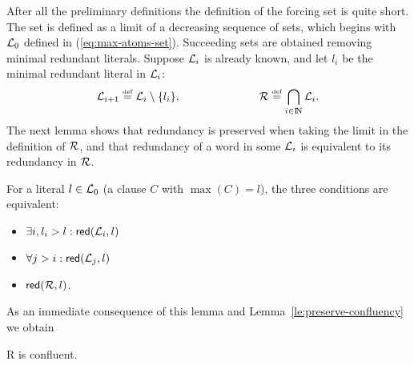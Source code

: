 After all the preliminary definitions the definition of the forcing set is quite
short. The set is defined as a limit of a decreasing sequence of sets, which 
begins with $\mbox {$\cal L$}_0$ defined in (\ref{eq:max-atoms-set}). Succeeding sets are 
obtained removing minimal redundant literals. Suppose $\mbox {$\cal L$}_i$ is already 
known, and let \(l_i\) be the minimal redundant literal in \(\mbox {$\cal L$}_i\):
\begin{equation} \label{eq:atoms-model}
\mbox {$\cal L$}_{i+1} \mathrel {\stackrel {\mbox {\tiny def}}{=}} \mbox {$\cal L$}_i \setminus \{l_i\}, \hspace{7em}
\mbox {$\cal R$} \mathrel {\stackrel {\mbox {\tiny def}}{=}} \bigcap_{i\in {{\rm I\!N}}} \mbox {$\cal L$}_i.
\end{equation}
%
The next lemma shows that redundancy
is preserved when taking the limit in the definition of $\mbox {$\cal R$}$,
and that redundancy of a word in some \(\mbox {$\cal L$}_i\) is equivalent
to its redundancy in $\mbox {$\cal R$}$.
\begin{LEMMA} \label{le:redundancy-limit}
For a literal $l\in\mbox {$\cal L$}_0$ (a clause $C$ with \(\max(C)=l\)), the three conditions are
equivalent: 
\begin{itemize}\MyLPar
\item $\exists i, l_i>l : \mbox{\sf red}(\mbox {$\cal L$}_i,l)$
\item $\forall j>i: \mbox{\sf red}(\mbox {$\cal L$}_j,l)$
\item $\mbox{\sf red}(\mbox {$\cal R$},l)$.
\end{itemize}
\end{LEMMA}
As an immediate consequence of this lemma
and Lemma~\ref {le:preserve-confluency}
we obtain
\begin{COROLLARY} \label{co:model-confluent}
\C R is confluent.
\end{COROLLARY}


